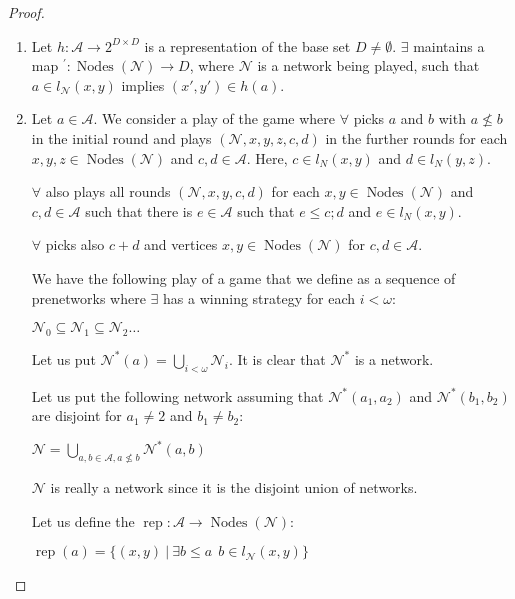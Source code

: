 \documentclass[a4paper]{article}
\theoremstyle{definition}
\theoremstyle{theorem}
\theoremstyle{proposition}
\theoremstyle{lemma}
\theoremstyle{ex}
\theoremstyle{corollary}
\theoremstyle{claim}
\begin{document}
\begin{proof}
$ $

  \begin{enumerate}
    \item Let $h : \mathcal{A} \to 2^{D \times D}$ is a representation of the base set $D \neq \emptyset$. $\exists$ maintains a map ${}^{'} : \operatorname{Nodes}(\mathcal{N}) \to D$, where $\mathcal{N}$ is a network being played, such that $a \in l_{\mathcal{N}}(x,y)$ implies $(x',y') \in h(a)$.

    \item
    Let $a \in \mathcal{A}$. We consider a play of the game where $\forall$ picks $a$ and $b$ with $a \not\leq b$ in the initial round and plays $(\mathcal{N}, x, y, z, c, d)$ in the further rounds for each $x, y, z \in \operatorname{Nodes}(\mathcal{N})$ and $c,d \in \mathcal{A}$. Here, $c \in l_N(x, y)$ and $d \in l_N(y, z)$.

    $\forall$ also plays all rounds $(\mathcal{N},x,y,c,d)$ for each $x, y \in \operatorname{Nodes}(\mathcal{N})$ and $c,d \in \mathcal{A}$ such that there is $e \in \mathcal{A}$ such that
    $e \leq c ; d$ and $e \in l_N(x,y)$.

    $\forall$ picks also $c + d$ and vertices $x,y \in \operatorname{Nodes}(\mathcal{N})$ for $c, d \in \mathcal{A}$.

    We have the following play of a game that we define as a sequence of prenetworks where $\exists$ has a winning strategy for each $i < \omega$:

    \begin{center}
      $\mathcal{N}_0 \subseteq \mathcal{N}_1 \subseteq \mathcal{N}_2 \dots$
    \end{center}

    Let us put $\mathcal{N}^{*}(a) = \bigcup \limits_{i < \omega} \mathcal{N}_i$. It is clear that $\mathcal{N}^{*}$ is a network.

    Let us put the following network assuming that $\mathcal{N}^{*}(a_1, a_2)$ and $\mathcal{N}^{*}(b_1, b_2)$ are disjoint for $a_1 \neq 2$ and $b_1 \neq b_2$:

    \begin{center}
      $\mathcal{N} = \bigcup \limits_{a,b \in \mathcal{A}, a \not\leq b} \mathcal{N}^{*}(a,b)$
    \end{center}

    $\mathcal{N}$ is really a network since it is the disjoint union of networks.

    Let us define the $\operatorname{rep} : \mathcal{A} \to \operatorname{Nodes}(\mathcal{N})$:
    \begin{center}
      $\operatorname{rep}(a) = \{ (x, y) \: | \: \exists b \leq a \:\: b \in l_{\mathcal{N}}(x, y)\}$
    \end{center}


\end{enumerate}
\end{proof}
\end{document}

